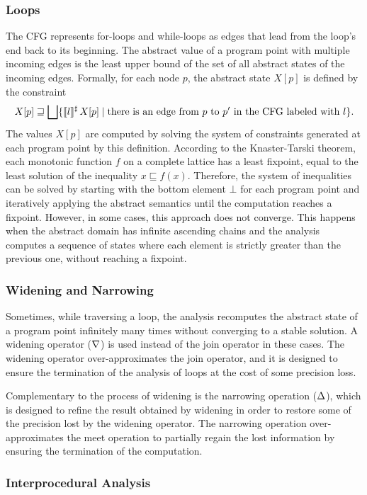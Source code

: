 \subsubsection{Loops}
The CFG represents for-loops and while-loops as edges that lead from the loop's end back to its beginning.
The abstract value of a program point with multiple incoming edges is
the least upper bound of the set of all abstract states of the incoming edges.
Formally, for each node $p$, the abstract state $X[p]$ is defined by the constraint
\[
  X[p] \sqsupseteq \bigsqcup \{\llbracket l\rrbracket^\sharp\,X[p] \mid \text{there is an edge from $p$ to $p'$ in the CFG labeled with $l$}\}.
\]
The values $X[p]$ are computed by solving the system of constraints generated at each program point by this definition.
According to the Knaster-Tarski theorem, each monotonic function $f$ on a complete lattice has a least fixpoint, equal to the least solution of the inequality $x \sqsubseteq f(x)$.
Therefore, the system of inequalities can be solved by starting with the bottom element $\bot$ for each program point and iteratively applying the abstract semantics until the computation reaches a fixpoint.
However, in some cases, this approach does not converge.
This happens when the abstract domain has infinite ascending chains and the analysis computes a sequence of states where each element is strictly greater than the previous one, without reaching a fixpoint.

\subsubsection{Widening and Narrowing}

Sometimes, while traversing a loop, the analysis recomputes the abstract state of a program point infinitely many times without converging to a stable solution.
A widening operator ($\nabla$) is used instead of the join operator in these cases.
The widening operator over-approximates the join operator, and it is designed to ensure the termination of the analysis of loops at the cost of some precision loss.

Complementary to the process of widening is the narrowing operation ($\Delta$), which is designed to refine the result obtained by widening in order to restore some of the precision lost by the widening operator.
The narrowing operation over-approximates the meet operation to partially regain the lost information by ensuring the termination of the computation.

\subsubsection{Interprocedural Analysis}

